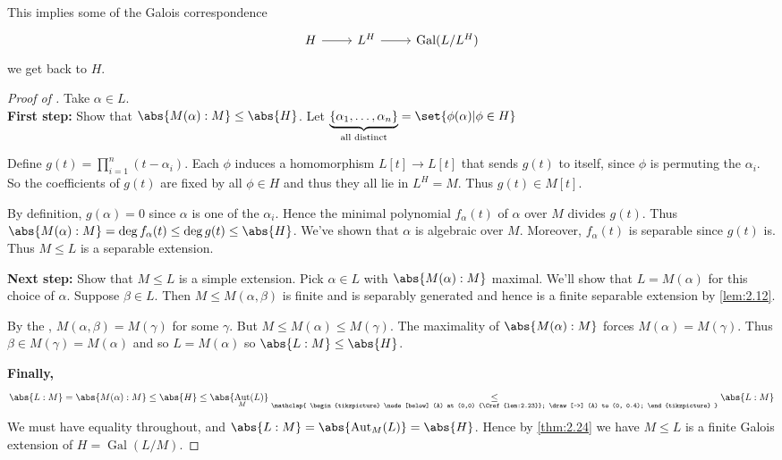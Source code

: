 \documentclass{article}
\DeclareMathOperator{\Aut}{Aut}
\DeclareMathOperator{\Gal}{Gal}
\begin{document}
\begin{remark}
    This implies some of the Galois correspondence
    \begin{equation*}
        \begin{tikzcd}
            H \arrow[r] & L^H \arrow[r] & \Gal(L / L^H)
        \end{tikzcd}
    \end{equation*}
    we get back to $H$.
\end{remark}

\begin{proof}[Proof of ]
    Take $\alpha \in L$. \\
    \textbf{First step:} Show that $\abs{M(\alpha):M} \leq \abs{H}$.
    Let $\underbrace{\{\alpha_1, \dotsc, \alpha_n\}}_{\text{all distinct}} = \set{\phi(\alpha) | \phi \in H}$

    Define $g(t) = \prod_{i=1}^n (t-\alpha_i)$.
    Each $\phi$ induces a homomorphism $L[t] \to L[t]$ that sends $g(t)$ to itself, since $\phi$ is permuting the $\alpha_i$.
    So the coefficients of $g(t)$ are fixed by all $\phi \in H$ and thus they all lie in $L^H = M$.
    Thus $g(t) \in M[t]$.

    By definition, $g(\alpha) = 0$ since $\alpha$ is one of the $\alpha_i$.
    Hence the minimal polynomial $f_\alpha(t)$ of $\alpha$ over $M$ divides $g(t)$.
    Thus $\abs{M(\alpha):M} = \deg f_\alpha(t) \leq \deg g(t) \leq \abs{H}$.
    We've shown that $\alpha$ is algebraic over $M$.
    Moreover, $f_\alpha(t)$ is separable since $g(t)$ is.
    Thus $M \leq L$ is a separable extension.

    \textbf{Next step:} Show that $M \leq L$ is a simple extension.
    Pick $\alpha \in L$ with $\abs{M(\alpha):M}$ maximal.
    We'll show that $L = M(\alpha)$ for this choice of $\alpha$.
    Suppose $\beta \in L$. Then $M \leq M(\alpha, \beta)$ is finite and is separably generated and hence is a finite separable extension by \cref{lem:2.12}.

    By the , $M(\alpha, \beta) = M(\gamma)$ for some $\gamma$.
    But $M \leq M(\alpha) \leq M(\gamma)$.
    The maximality of $\abs{M(\alpha):M}$ forces $M(\alpha) = M(\gamma)$.
    Thus $\beta \in M(\gamma) = M(\alpha)$ and so $L = M(\alpha)$ so $\abs{L:M} \leq \abs{H}$.

    \textbf{Finally,}
    \begin{equation*}
        \abs{L:M} = \abs{M(\alpha):M} \leq \abs{H} \leq \abs{\Aut_M(L)} \underset{\mathclap{
        \begin{tikzpicture}
            \node[below] (A) at (0,0) {\Cref{lem:2.23}};
            \draw[->] (A) to (0, 0.4);
        \end{tikzpicture}
        }}{\leq} \abs{L:M}
    \end{equation*}
    We must have equality throughout, and $\abs{L:M} = \abs{\Aut_M(L)} = \abs{H}$.
    Hence by \cref{thm:2.24} we have $M \leq L$ is a finite Galois extension of $H = \Gal(L/M)$.  %
\end{proof}
\end{document}
